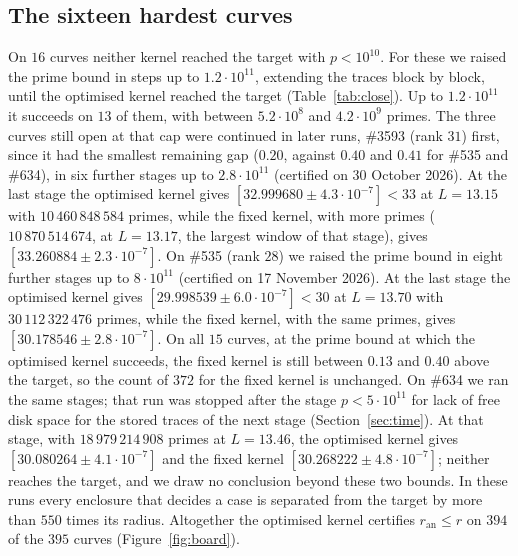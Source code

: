 \documentclass[11pt]{amsart}
\theoremstyle{remark}
\theoremstyle{definition}
\newcommand{\ran}{r_{\mathrm{an}}}
\begin{document}
\subsection*{The sixteen hardest curves}
On $16$ curves neither kernel reached the target with $p<10^{10}$. For these we raised the prime bound in steps up to $1.2\cdot10^{11}$, extending the traces block by block, until the optimised kernel reached the target (Table~\ref{tab:close}). Up to $1.2\cdot10^{11}$ it succeeds on $13$ of them, with between $5.2\cdot10^{8}$ and $4.2\cdot10^{9}$ primes. The three curves still open at that cap were continued in later runs, \#3593 (rank $31$) first, since it had the smallest remaining gap ($0.20$, against $0.40$ and $0.41$ for \#535 and \#634), in six further stages up to $2.8\cdot10^{11}$ (certified on 30 October 2026). At the last stage the optimised kernel gives $[32.999680\pm4.3\cdot10^{-7}]<33$ at $L=13.15$ with $10\,460\,848\,584$ primes, while the fixed kernel, with more primes ($10\,870\,514\,674$, at $L=13.17$, the largest window of that stage), gives $[33.260884\pm2.3\cdot10^{-7}]$. On \#535 (rank $28$) we raised the prime bound in eight further stages up to $8\cdot10^{11}$ (certified on 17 November 2026). At the last stage the optimised kernel gives $[29.998539\pm6.0\cdot10^{-7}]<30$ at $L=13.70$ with $30\,112\,322\,476$ primes, while the fixed kernel, with the same primes, gives $[30.178546\pm2.8\cdot10^{-7}]$. On all $15$ curves, at the prime bound at which the optimised kernel succeeds, the fixed kernel is still between $0.13$ and $0.40$ above the target, so the count of $372$ for the fixed kernel is unchanged. On \#634 we ran the same stages; that run was stopped after the stage $p<5\cdot10^{11}$ for lack of free disk space for the stored traces of the next stage (Section~\ref{sec:time}). At that stage, with $18\,979\,214\,908$ primes at $L=13.46$, the optimised kernel gives $[30.080264\pm4.1\cdot10^{-7}]$ and the fixed kernel $[30.268222\pm4.8\cdot10^{-7}]$; neither reaches the target, and we draw no conclusion beyond these two bounds. In these runs every enclosure that decides a case is separated from the target by more than $550$ times its radius. Altogether the optimised kernel certifies $\ran\le r$ on $394$ of the $395$ curves (Figure~\ref{fig:board}).
\end{document}
